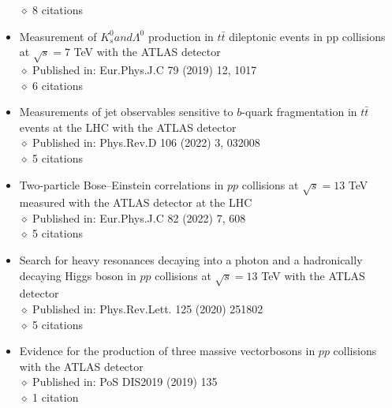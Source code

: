 \documentclass[margin, 10pt]{res} %
\begin{document}
\begin{resume}
\begin{itemize}
$\diamond$ 8 citations
\item Measurement of $K^{0}_{s} and \Lambda^{0}$ production in $t\bar{t}$ dileptonic events in pp collisions at $\sqrt{s} = 7$ TeV with the ATLAS detector\\
$\diamond$ Published in: Eur.Phys.J.C 79 (2019) 12, 1017\\
$\diamond$ 6 citations
\item Measurements of jet observables sensitive to $b$-quark fragmentation in $t\bar{t}$ events at the LHC with the ATLAS detector\\
$\diamond$ Published in: Phys.Rev.D 106 (2022) 3, 032008\\
$\diamond$ 5 citations
\item Two-particle Bose–Einstein correlations in $pp$ collisions at $\sqrt{s} = 13$ TeV measured with the ATLAS detector at the LHC\\
$\diamond$ Published in: Eur.Phys.J.C 82 (2022) 7, 608\\
$\diamond$ 5 citations
\item Search for heavy resonances decaying into a photon and a hadronically decaying Higgs boson in $pp$ collisions at $\sqrt{s} = 13$ TeV with the ATLAS detector\\
$\diamond$ Published in: Phys.Rev.Lett. 125 (2020) 251802\\
$\diamond$ 5 citations
\item Evidence for the production of three massive vectorbosons in $pp$ collisions with the ATLAS detector\\
$\diamond$ Published in: PoS DIS2019 (2019) 135\\
$\diamond$ 1 citation





\end{itemize}
\end{resume}
\end{document}
